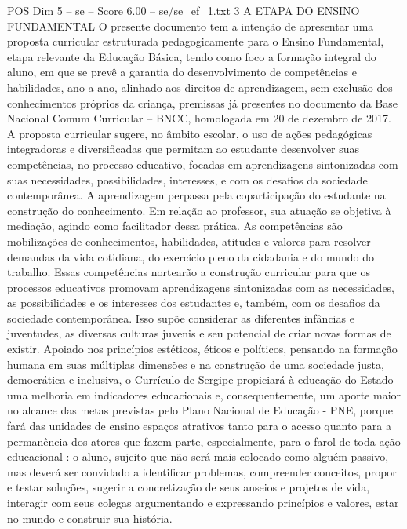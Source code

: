 \begin{textsample}{POS Dim 5 – se – Score 6.00 – se/se\_ef\_1.txt}  \label{ex:f5_pos_134}
3 A ETAPA DO ENSINO FUNDAMENTAL O presente documento tem a intenção de apresentar uma proposta curricular estruturada pedagogicamente para o Ensino Fundamental, etapa relevante da Educação Básica, tendo como foco a formação integral do aluno, em que se prevê a garantia do desenvolvimento de competências e habilidades, ano a ano, alinhado aos direitos de aprendizagem, sem exclusão dos conhecimentos próprios da criança, premissas já presentes no documento da Base Nacional Comum Curricular – BNCC, homologada em 20 de dezembro de 2017.
A proposta curricular sugere, no âmbito escolar, o uso de ações pedagógicas integradoras e diversificadas que permitam ao estudante desenvolver suas competências, no processo educativo, focadas em aprendizagens sintonizadas com suas necessidades, possibilidades, interesses, e com os desafios da sociedade contemporânea.
A aprendizagem perpassa pela coparticipação do estudante na construção do conhecimento.
Em relação ao professor, sua atuação se objetiva à mediação, agindo como facilitador dessa prática.
As competências são mobilizações de conhecimentos, habilidades, atitudes e valores para resolver demandas da vida cotidiana, do exercício pleno da cidadania e do mundo do trabalho.
Essas competências nortearão a construção curricular para que os processos educativos promovam aprendizagens sintonizadas com as necessidades, as possibilidades e os interesses dos estudantes e, também, com os desafios da sociedade contemporânea.
Isso supõe considerar as diferentes infâncias e juventudes, as diversas culturas juvenis e seu potencial de criar novas formas de existir.
Apoiado nos princípios estéticos, éticos e políticos, pensando na formação humana em suas múltiplas dimensões e na construção de uma sociedade justa, democrática e inclusiva, o Currículo de Sergipe propiciará à educação do Estado uma melhoria em indicadores educacionais e, consequentemente, um aporte maior no alcance das metas previstas pelo Plano Nacional de Educação - PNE, porque fará das unidades de ensino espaços atrativos tanto para o acesso quanto para a permanência dos atores que fazem parte, especialmente, para o farol de toda ação educacional : o aluno, sujeito que não será mais colocado como alguém passivo, mas deverá ser convidado a identificar problemas, compreender conceitos, propor e testar soluções, sugerir a concretização de seus anseios e projetos de vida, interagir com seus colegas argumentando e expressando princípios e valores, estar no mundo e construir sua história.

\end{textsample}
